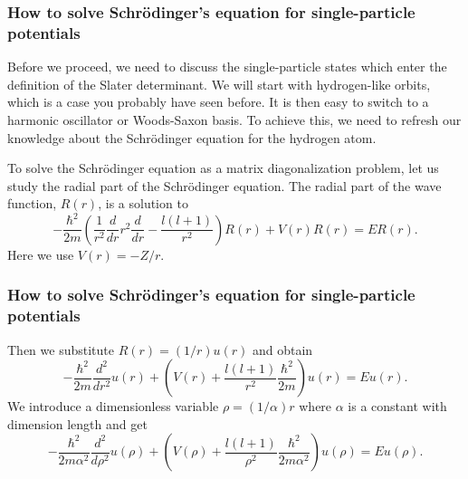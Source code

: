 \documentclass[compress]{beamer}
\begin{document}


\frame
{
  \frametitle{How to solve Schr\"odinger's equation for single-particle potentials}
\begin{small}
{\scriptsize
Before we proceed, we need to discuss the single-particle states which enter the definition of the Slater determinant. We will start with hydrogen-like orbits, which is a case you probably have seen before. It is then easy to switch to 
a harmonic oscillator or Woods-Saxon basis.
To achieve this, we need to refresh our knowledge about the Schr\"odinger equation for the hydrogen atom.

To solve the Schr\"odinger equation as a matrix diagonalization problem,
let us study the radial part of the Schr\"odinger equation. 
The radial part of the wave function, $R(r)$, is a solution to  
%
\[
  -\frac{\hbar^2}{2 m} \left ( \frac{1}{r^2} \frac{d}{dr} r^2
  \frac{d}{dr} - \frac{l (l + 1)}{r^2} \right )R(r) 
     + V(r) R(r) = E R(r).
\]
Here we use $V(r) = -Z/r$.
}
\end{small}
}

\frame
{
  \frametitle{How to solve Schr\"odinger's equation for single-particle potentials}
\begin{small}
{\scriptsize
%
Then we substitute $R(r) = (1/r) u(r)$ and obtain
%
\[
  -\frac{\hbar^2}{2 m} \frac{d^2}{dr^2} u(r) 
       + \left ( V(r) + \frac{l (l + 1)}{r^2}\frac{\hbar^2}{2 m}
                                    \right ) u(r)  = E u(r) .
\]
%
We introduce a dimensionless variable $\rho = (1/\alpha) r$
where $\alpha$ is a constant with dimension length and get
% 
\[
  -\frac{\hbar^2}{2 m \alpha^2} \frac{d^2}{d\rho^2} u(\rho) 
       + \left ( V(\rho) + \frac{l (l + 1)}{\rho^2}
         \frac{\hbar^2}{2 m\alpha^2} \right ) u(\rho)  = E u(\rho) .
\]
}
\end{small}
}
\end{document}
